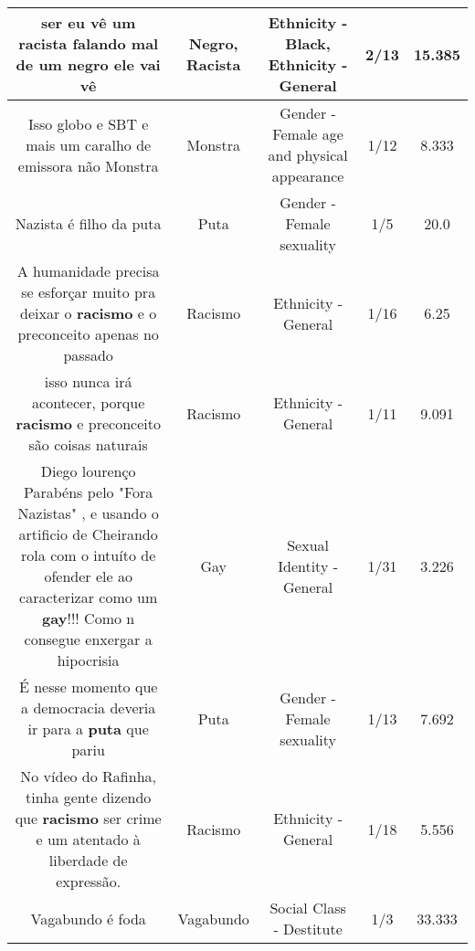 \documentclass[11pt]{article}
\newlength\mylength
\begin{document}
\begin{center}
\begin{longtable}{|C{.65\mylength}|C{.30\mylength}|C{.12\mylength}|C{.12\mylength}|C{.12\mylength}|}
  \small ser eu vê  um  \textbf{racista} falando mal de um \textbf{negro} ele vai vê\normalsize   & Negro, Racista & Ethnicity - Black, Ethnicity - General & 2/13 & 15.385 \\  \hline
  \small Isso globo e SBT e mais um caralho de emissora não Monstra\normalsize   & Monstra & Gender - Female age and physical appearance & 1/12 & 8.333 \\  \hline
  \small Nazista é filho da puta\normalsize   & Puta & Gender - Female sexuality & 1/5 & 20.0 \\  \hline
  \small A humanidade precisa se esforçar muito pra deixar o \textbf{racismo} e o preconceito apenas no passado\normalsize   & Racismo & Ethnicity - General & 1/16 & 6.25 \\  \hline
  \small isso nunca irá acontecer, porque \textbf{racismo} e preconceito são coisas naturais\normalsize   & Racismo & Ethnicity - General & 1/11 & 9.091 \\  \hline
  \small Diego lourenço Parabéns pelo "Fora Nazistas" , e usando o artificio de Cheirando rola com o intuíto de ofender ele ao caracterizar como um \textbf{gay}!!! Como n consegue enxergar a hipocrisia\normalsize   & Gay & Sexual Identity - General & 1/31 & 3.226 \\  \hline
  \small É nesse momento que a democracia deveria ir para a \textbf{puta} que pariu\normalsize   & Puta & Gender - Female sexuality & 1/13 & 7.692 \\  \hline
  \small No vídeo do Rafinha, tinha gente dizendo que \textbf{racismo} ser crime e um atentado à liberdade de expressão.\normalsize   & Racismo & Ethnicity - General & 1/18 & 5.556 \\  \hline
  \small Vagabundo é foda\normalsize   & Vagabundo & Social Class - Destitute & 1/3 & 33.333 \\  \hline

\end{longtable}
\end{center}
\end{document}

